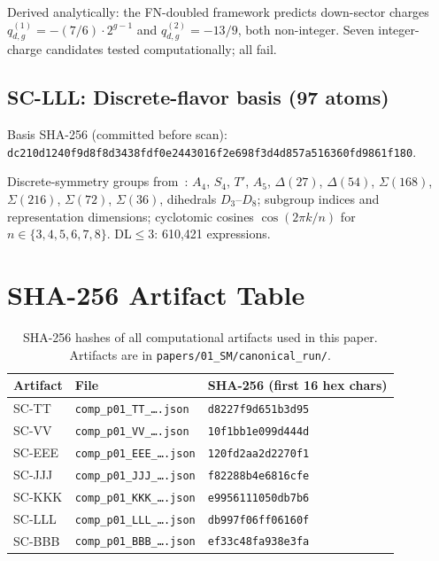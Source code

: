 \documentclass[11pt]{article}
\theoremstyle{remark}
\begin{document}
Derived analytically: the FN-doubled framework predicts down-sector charges
$q_{d,g}^{(1)} = -(7/6)\cdot 2^{g-1}$ and $q_{d,g}^{(2)} = -13/9$, both
non-integer.  Seven integer-charge candidates tested computationally; all fail.

\subsection*{SC-LLL: Discrete-flavor basis (97 atoms)}

Basis SHA-256 (committed before scan):\\
\texttt{dc210d1240f9d8f8d3438fdf0e2443016f2e698f3d4d857a516360fd9861f180}.

Discrete-symmetry groups from~\cite{Ishimori2010}:
$A_4$, $S_4$, $T'$, $A_5$,
$\Delta(27)$, $\Delta(54)$,
$\Sigma(168)$, $\Sigma(216)$, $\Sigma(72)$, $\Sigma(36)$,
dihedrals $D_3$--$D_8$;
subgroup indices and representation dimensions;
cyclotomic cosines $\cos(2\pi k/n)$ for $n\in\{3,4,5,6,7,8\}$.
DL$\leq3$: 610{,}421 expressions.

\section{SHA-256 Artifact Table}
\label{app:sha}

\begin{table}[H]
\centering
\caption{SHA-256 hashes of all computational artifacts used in this paper.
Artifacts are in \texttt{papers/01\_SM/canonical\_run/}.}
\label{tab:sha}
\small
\begin{tabular}{lll}
\toprule
Artifact & File & SHA-256 (first 16 hex chars) \\
\midrule
SC-TT & \texttt{comp\_p01\_TT\_\ldots.json} & \texttt{d8227f9d651b3d95} \\
SC-VV & \texttt{comp\_p01\_VV\_\ldots.json} & \texttt{10f1bb1e099d444d} \\
SC-EEE & \texttt{comp\_p01\_EEE\_\ldots.json} & \texttt{120fd2aa2d2270f1} \\
SC-JJJ & \texttt{comp\_p01\_JJJ\_\ldots.json} & \texttt{f82288b4e6816cfe} \\
SC-KKK & \texttt{comp\_p01\_KKK\_\ldots.json} & \texttt{e9956111050db7b6} \\
SC-LLL & \texttt{comp\_p01\_LLL\_\ldots.json} & \texttt{db997f06ff06160f} \\
SC-BBB & \texttt{comp\_p01\_BBB\_\ldots.json} & \texttt{ef33c48fa938e3fa} \\
\bottomrule
\end{tabular}
\end{table}
\end{document}
